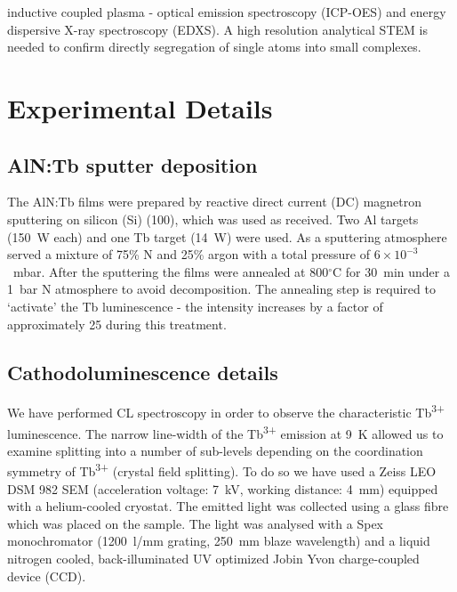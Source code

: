\documentclass[%
aip,
rsi,%
 amsmath,amssymb,%
 reprint,%
]{revtex4-1}
\begin{document}
inductive coupled plasma - optical emission spectroscopy (ICP-OES) and energy dispersive X-ray spectroscopy (EDXS). A high resolution analytical STEM is needed to confirm directly segregation of single atoms into small complexes.

\section{Experimental Details}
\label{sec:exp_detail}

\subsection{AlN:Tb sputter deposition}
\label{sec:growth}

The AlN:Tb films were prepared by reactive direct current (DC) magnetron sputtering on silicon (Si) (100), which was used as received. Two Al targets (150~W each) and one Tb target (14~W) were used. As a sputtering atmosphere served a mixture of 75\% N and 25\% argon with a total pressure of $6 \times 10^{-3}$~mbar. After the sputtering the films were annealed at 800$^\circ$C for 30~min under a 1~bar N atmosphere to avoid decomposition. The annealing step is required to \lq{activate}\rq{} the Tb luminescence - the intensity increases by a factor of approximately 25 during this treatment.

\subsection{Cathodoluminescence details}
\label{sec:CL}

We have performed CL spectroscopy in order to observe the characteristic Tb\textsuperscript{3+} luminescence. The narrow line-width of the Tb\textsuperscript{3+} emission at 9~K allowed us to examine splitting into a number of sub-levels depending on the coordination symmetry of Tb\textsuperscript{3+} (crystal field splitting). To do so we have used a Zeiss LEO DSM 982 SEM \cite{Schirra2007} (acceleration voltage: 7~kV, working distance: 4~mm) equipped with a helium-cooled cryostat. The emitted light was collected using a glass fibre which was placed on the sample. The light was analysed with a Spex monochromator (1200~l/mm grating, 250~mm blaze wavelength) and a liquid nitrogen cooled, back-illuminated UV optimized Jobin Yvon charge-coupled device (CCD).
\end{document}
